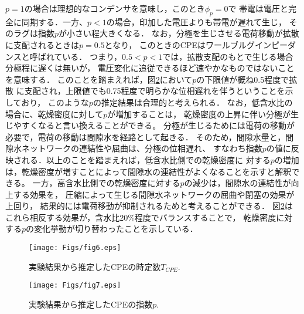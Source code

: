 \documentclass{jsce}
\begin{document}
$p=1$の場合は理想的なコンデンサを意味し，このとき$\phi_p=0$で
帯電は電圧と完全に同期する．一方、$p<1$の場合，印加した電圧よりも帯電が遅れて生じ，
そのラグは指数$p$が小さい程大きくなる．
なお，分極を生じさせる電荷移動が拡散に支配されるときは$p=0.5$となり，
このときのCPEはワールブルグインピーダンスと呼ばれている．
つまり，$0.5<p<1$では，拡散支配のもとで生じる場合分極程に遅くは無いが，
電圧変化に追従できるほど速やかなものではないことを意味する．
このことを踏まえれば，図\ref{fig:fig7}において$p$の下限値が概ね0.5程度で拡散
に支配され，上限値でも0.75程度で明らかな位相遅れを伴うということを示しており，
このような$p$の推定結果は合理的と考えられる．
なお，低含水比の場合に、乾燥密度に対して$p$が増加することは，
乾燥密度の上昇に伴い分極が生じやすくなると言い換えることができる。
分極が生じるためには電荷の移動が必要で，電荷の移動は間隙水を経路として起きる．
そのため，間隙水量と，間隙水ネットワークの連結性や屈曲は、分極の位相遅れ、
すなわち指数$p$の値に反映される．以上のことを踏まえれば，低含水比側での乾燥密度に
対する$p$の増加は，乾燥密度が増すことによって間隙水の連結性がよくなることを示すと解釈できる。
一方，高含水比側での乾燥密度に対する$p$の減少は，間隙水の連結性が向上する効果を，
圧縮によって生じる間隙水ネットワークの屈曲や閉塞の効果が上回り，
結果的には電荷移動が抑制されるためと考えることができる．
図\ref{fig:fig7}はこれら相反する効果が，含水比20\%程度でバランスすることで，
乾燥密度に対する$p$の変化挙動が切り替わったことを示している．
\begin{figure}[h]
	\begin{center}
	\texttt{[image: Figs/fig6.eps]} 
	\end{center}
\vspace{-3mm}
	\caption{
		実験結果から推定したCPEの時定数$T_{CPE}$.
	} 
	\label{fig:fig6}
\end{figure}
\begin{figure}[h]
	\begin{center}
	\texttt{[image: Figs/fig7.eps]} 
	\end{center}
\vspace{-3mm}
	\caption{
		実験結果から推定したCPEの指数$p$.
	} 
	\label{fig:fig7}
\end{figure}
\vspace{-4mm}
\end{document}
